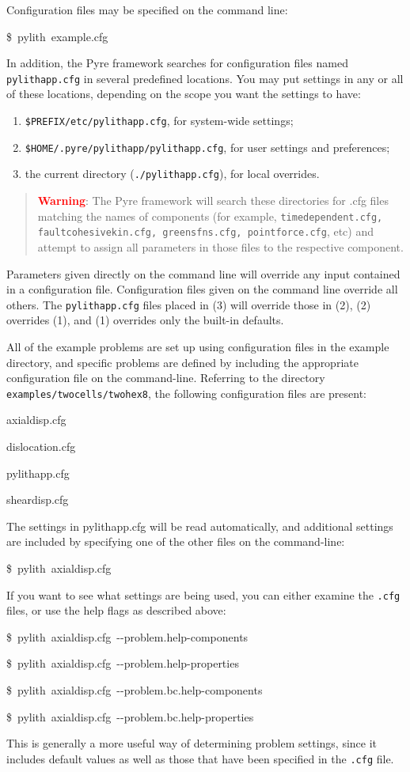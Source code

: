 Configuration files may be specified on the command line:
\begin{lyxcode}
\$~pylith~example.cfg
\end{lyxcode}
In addition, the Pyre framework searches for configuration files named
\texttt{pylithapp.cfg} in several predefined locations. You may put
settings in any or all of these locations, depending on the scope
you want the settings to have:
\begin{enumerate}
\item \texttt{\$PREFIX/etc/pylithapp.cfg}, for system-wide settings;
\item \texttt{\$HOME/.pyre/pylithapp/pylithapp.cfg}, for user settings and
preferences;
\item the current directory (\texttt{./pylithapp.cfg}), for local overrides. \end{enumerate}
\begin{quote}
\textbf{\textcolor{red}{Warning}}: The Pyre framework will search
these directories for .cfg files matching the names of components
(for example, \texttt{timedependent.cfg, faultcohesivekin.cfg, greensfns.cfg,
pointforce.cfg}, etc) and attempt to assign all parameters in those
files to the respective component.
\end{quote}
Parameters given directly on the command line will override any input
contained in a configuration file. Configuration files given on the
command line override all others. The \texttt{pylithapp.cfg} files
placed in (3) will override those in (2), (2) overrides (1), and (1)
overrides only the built-in defaults.

All of the example problems are set up using configuration files in
the example directory, and specific problems are defined by including
the appropriate configuration file on the command-line. Referring
to the directory \texttt{examples/twocells/twohex8}, the following
configuration files are present:
\begin{lyxcode}
axialdisp.cfg

dislocation.cfg

pylithapp.cfg

sheardisp.cfg
\end{lyxcode}
The settings in pylithapp.cfg will be read automatically, and additional
settings are included by specifying one of the other files on the
command-line:
\begin{lyxcode}
\$~pylith~axialdisp.cfg
\end{lyxcode}
If you want to see what settings are being used, you can either examine
the \texttt{.cfg} files, or use the help flags as described above:
\begin{lyxcode}
\$~pylith~axialdisp.cfg~-{}-problem.help-components

\$~pylith~axialdisp.cfg~-{}-problem.help-properties

\$~pylith~axialdisp.cfg~-{}-problem.bc.help-components

\$~pylith~axialdisp.cfg~-{}-problem.bc.help-properties
\end{lyxcode}
This is generally a more useful way of determining problem settings,
since it includes default values as well as those that have been specified
in the \texttt{.cfg} file.


